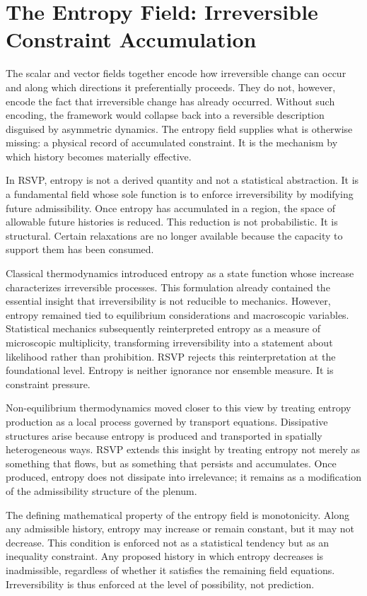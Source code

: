 \documentclass[11pt,oneside]{book}
\begin{document}
\chapter{The Entropy Field: Irreversible Constraint Accumulation}

The scalar and vector fields together encode how irreversible change can occur and along which directions it preferentially proceeds. They do not, however, encode the fact that irreversible change has already occurred. Without such encoding, the framework would collapse back into a reversible description disguised by asymmetric dynamics. The entropy field supplies what is otherwise missing: a physical record of accumulated constraint. It is the mechanism by which history becomes materially effective.

In RSVP, entropy is not a derived quantity and not a statistical abstraction. It is a fundamental field whose sole function is to enforce irreversibility by modifying future admissibility. Once entropy has accumulated in a region, the space of allowable future histories is reduced. This reduction is not probabilistic. It is structural. Certain relaxations are no longer available because the capacity to support them has been consumed.

Classical thermodynamics introduced entropy as a state function whose increase characterizes irreversible processes. This formulation already contained the essential insight that irreversibility is not reducible to mechanics. However, entropy remained tied to equilibrium considerations and macroscopic variables. Statistical mechanics subsequently reinterpreted entropy as a measure of microscopic multiplicity, transforming irreversibility into a statement about likelihood rather than prohibition. RSVP rejects this reinterpretation at the foundational level. Entropy is neither ignorance nor ensemble measure. It is constraint pressure.

Non-equilibrium thermodynamics moved closer to this view by treating entropy production as a local process governed by transport equations. Dissipative structures arise because entropy is produced and transported in spatially heterogeneous ways. RSVP extends this insight by treating entropy not merely as something that flows, but as something that persists and accumulates. Once produced, entropy does not dissipate into irrelevance; it remains as a modification of the admissibility structure of the plenum.

The defining mathematical property of the entropy field is monotonicity. Along any admissible history, entropy may increase or remain constant, but it may not decrease. This condition is enforced not as a statistical tendency but as an inequality constraint. Any proposed history in which entropy decreases is inadmissible, regardless of whether it satisfies the remaining field equations. Irreversibility is thus enforced at the level of possibility, not prediction.
\end{document}

